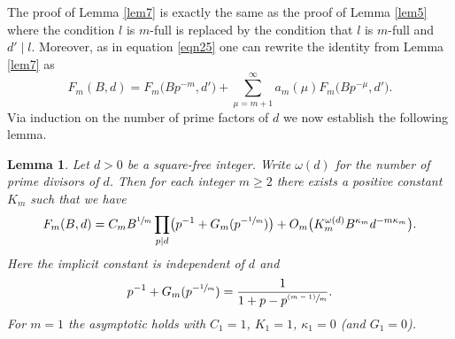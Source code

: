 \documentclass[JEP,XML,SOM,Unicode,published]{cedram}
\newcommand{\psfrac}[2]{\sfrac{(#1)}{#2}}
\let\kap\kappa
\let\ome\omega
\newtheorem{lemma}[theorem]{Lemma}
\theoremstyle{definition}
\numberwithin{theorem}{section}
\begin{document}
The proof of Lemma \ref{lem7} is exactly the same as the proof of Lemma \ref{lem5} where the condition $l$ is $m$-full is replaced by the condition that $l$ is $m$-full and $d'\mid l$. Moreover, as in equation \eqref{eqn25} one can rewrite the identity from Lemma \ref{lem7} as
\begin{equation}\label{eqn27}
F_m(B,d) = F_m\bigl(Bp^{-m},d'\bigr) +\sum_{\mu=m+1}^\infty a_m(\mu) F_m\bigl(Bp^{-\mu},d'\bigr).
\end{equation}
Via induction on the number of prime factors of $d$ we now establish the following lemma.

\begin{lemma}\label{lem8}
Let $d>0$ be a square-free integer. Write $\ome(d)$ for the number of prime divisors of $d$. Then for each integer $m\geq 2$ there exists a positive constant $K_m$ such that we have
\[
F_m(B,d)=C_mB^{\sfrac{1}{m}}\prod_{p\mid d} \bigl(p^{-1}+G_m(p^{-\sfrac{1}{m}})\bigr)+ O_m\bigl(K_m^{\ome(d)}B^{\kap_m}d^{-m\kap_m}\bigr).
\]
Here the implicit constant is independent of $d$ and
\begin{equation}
\label{eq:G_m_explicit}
p^{-1}+G_{m}(p^{-\sfrac{1}{m}})=\frac1{1+p-p^{\psfrac{m-1}m}}.
\end{equation}
For $m=1$ the asymptotic holds with $C_1=1$, $K_1=1$, $\kap_1=0$ (and $G_1=0$).
\end{lemma}
\end{document}
